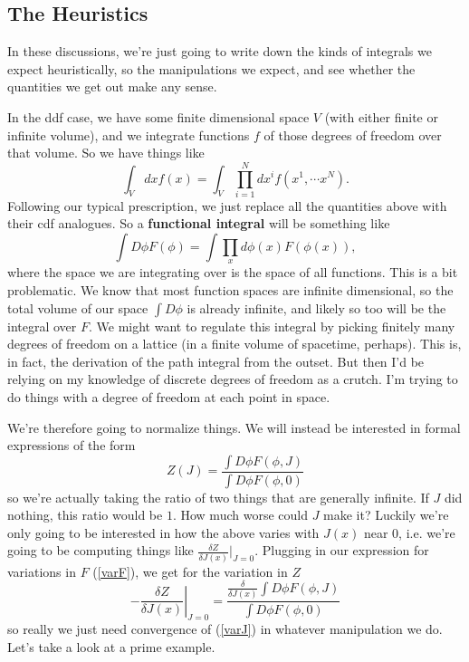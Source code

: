 \documentclass{book}
\begin{document}
\subsection{The Heuristics}

In these discussions, we're just going to write down the kinds of integrals we expect heuristically, so the manipulations we expect, and see whether the quantities we get out make any sense.

In the ddf case, we have some finite dimensional space $V$ (with either finite or infinite volume), and we integrate functions $f$ of those degrees of freedom over that volume. So we have things like
\[
\int_{V} dx f(x) = \int_V \prod_{i=1}^N dx^i f(x^1,\cdots x^N).
\]
Following our typical prescription, we just replace all the quantities above with their cdf analogues. So a \textbf{functional integral} will be something like
\[
\int D \phi F(\phi) = \int \prod_x d \phi (x) F(\phi(x)),
\]
where the space we are integrating over is the space of all functions. This is a bit problematic. We know that most function spaces are infinite dimensional, so the total volume of our space $\int D \phi$ is already infinite, and likely so too will be the integral over $F$. We might want to regulate this integral by picking finitely many degrees of freedom on a lattice (in a finite volume of spacetime, perhaps). This is, in fact, the derivation of the path integral from the outset. But then I'd be relying on my knowledge of discrete degrees of freedom as a crutch. I'm trying to do things with a degree of freedom at each point in space.

We're therefore going to normalize things. We will instead be interested in formal expressions of the form
\[
Z(J) = \frac{\int D\phi F(\phi,J)}{\int D\phi F(\phi,0)}
\]
so we're actually taking the ratio of two things that are generally infinite. If $J$ did nothing, this ratio would be $1$. How much worse could $J$ make it? Luckily we're only going to be interested in how the above varies with $J(x)$ near 0, i.e. we're going to be computing things like $\frac{\delta Z}{\delta J(x)}\Big\vert_{J=0}$. Plugging in our expression for variations in $F$ (\ref{varF}), we get for the variation in $Z$
\begin{equation} \label{varJ}
-\left. \frac{\delta Z}{\delta J(x)} \right\vert_{J=0} = \frac{\frac{\delta}{\delta J(x)}\int D \phi F(\phi,J)
}{\int D \phi F(\phi,0)}
\end{equation}
so really we just need convergence of (\ref{varJ}) in whatever manipulation we do. Let's take a look at a prime example.
\end{document}
